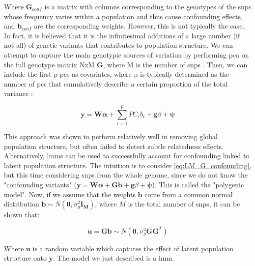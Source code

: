 Where $\mathbf{G}_{conf}$ is a matrix with columns corresponding to the genotypes of the \gls{snp}s whose frequency varies within a population and thus cause confounding effects, and $\mathbf{b}_{conf}$ are the corresponding weights. 
However, this is not typically the case.
In fact, it is believed that it is the infinitesimal additions of a large number (if not all) of genetic variants that contributes to population structure.
We can attempt to capture the main genotypic sources of variation by performing \gls{pca} on the full genotype matrix NxM $\mathbf{G}$, where M is the number of \gls{snp}s \cite{price2006principal}.
Then, we can include the first p \gls{pc}s as covariates, where p is typically determined as the number of \gls{pc}s that cumulatively describe a certain proportion of the total variance \cite{price2006principal}:

\begin{equation}\label{eq:LM_PC_confounding}
    \mathbf{y} =  \mathbf{W}\boldsymbol{\alpha} + \sum_{i=1}^{p} PC_i b_i + \mathbf{g}\beta + \boldsymbol{\psi} 
\end{equation}

This approach was shown to perform relatively well in removing global population structure, but often failed to detect subtle relatedness effects.\\

Alternatively, \gls{lmm}s can be used to successfully account for confounding linked to latent population structure.
The intuition is to consider \eqref{eq:LM_G_confounding}, but this time considering \gls{snp}s from the whole genome, since we do not know the "confounding variants" ($\mathbf{y} =  \mathbf{W}\boldsymbol{\alpha} +  \mathbf{G}\mathbf{b} + \mathbf{g}\beta + \boldsymbol{\psi}$).
This is called the "polygenic model".
Now, if we assume that the weights $\mathbf{b}$ come from a common normal distribution $\mathbf{b} \sim N(\mathbf{0},\sigma^2_g\mathbf{I_M})$, where $M$ is the total number of \gls{snp}s, it can be shown that:

\begin{equation}\label{eq:LMM_u_confounding}
    \mathbf{u} =  \mathbf{G}\mathbf{b} \sim N(\mathbf{0},\sigma^2_g \mathbf{G}\mathbf{G}^T)
\end{equation}

Where $\mathbf{u}$ is a random variable which captures the effect of latent population structure onto $\mathbf{y}$.
The model we just described is a \gls{lmm}.\\

